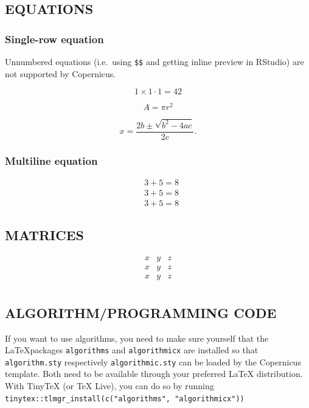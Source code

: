 \documentclass[gmd, manuscript]{copernicus}
\begin{document}
\subsection{EQUATIONS}

\subsubsection{Single-row equation}

Unnumbered equations (i.e.~using \texttt{\$\$} and getting inline
preview in RStudio) are not supported by Copernicus.

\begin{equation}
1 \times 1 \cdot 1 = 42
\end{equation}

\begin{equation}
A = \pi r^2
\end{equation}

\begin{equation}
x=\frac{2b\pm\sqrt{b^{2}-4ac}}{2c}.  
\end{equation}

\subsubsection{Multiline equation}

\begin{align}
& 3 + 5 = 8\\
& 3 + 5 = 8\\
& 3 + 5 = 8
\end{align}

\subsection{MATRICES}

\[
\begin{matrix}
x & y & z\\
x & y & z\\
x & y & z\\
\end{matrix}
\]

\subsection{ALGORITHM/PROGRAMMING CODE}

If you want to use algorithms, you need to make sure yourself that the
\LaTeX packages \texttt{algorithms} and \texttt{algorithmicx} are
installed so that \texttt{algorithm.sty} respectively
\texttt{algorithmic.sty} can be loaded by the Copernicus template. Both
need to be available through your preferred \LaTeX{} distribution. With
TinyTeX (or TeX Live), you can do so by running
\texttt{tinytex::tlmgr\_install(c("algorithms",\ "algorithmicx"))}
\end{document}
